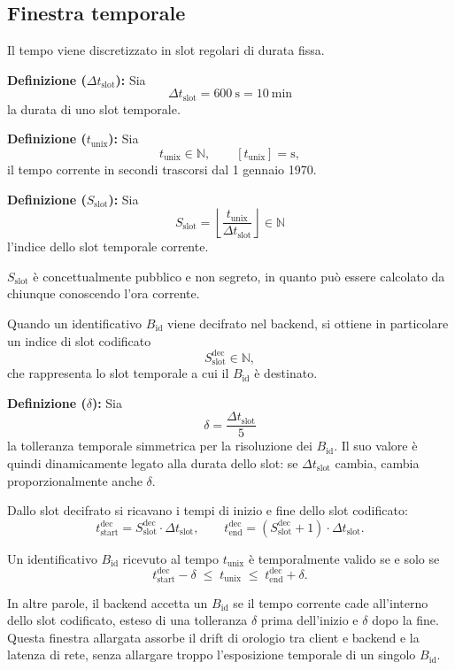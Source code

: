 \documentclass[a4paper,11pt]{article}
\begin{document}
\subsection{Finestra temporale}
Il tempo viene discretizzato in slot regolari di durata fissa.

\textbf{Definizione (\(\Delta t_{\text{slot}}\)):} Sia
\[
  \Delta t_{\text{slot}} = \SI{600}{\second} = \SI{10}{\minute}
\]
la durata di uno slot temporale.

\textbf{Definizione (\(t_{\text{unix}}\)):}
Sia
\[
  t_{\text{unix}} \in \mathbb{N}, \qquad [t_{\text{unix}}] = \si{\second},
\]
il tempo corrente in secondi trascorsi dal 1 gennaio 1970.

\textbf{Definizione (\(S_{\text{slot}}\)):}
Sia
\[
  S_{\text{slot}}
  = \left\lfloor \frac{t_{\text{unix}}}{\Delta t_{\text{slot}}} \right\rfloor
  \in \mathbb{N}
\]
l'indice dello slot temporale corrente.

\(S_{\text{slot}}\) è concettualmente pubblico e non segreto, in quanto può essere calcolato da
chiunque conoscendo l'ora corrente.

Quando un identificativo \(B_{\text{id}}\) viene decifrato nel backend, si ottiene in particolare un
indice di slot codificato
\[
  S_{\text{slot}}^{\text{dec}} \in \mathbb{N},
\]
che rappresenta lo slot temporale a cui il \(B_{\text{id}}\) è destinato.

\textbf{Definizione (\(\delta\)):}
Sia
\[
  \delta = \frac{\Delta t_{\text{slot}}}{5}
\]
la tolleranza temporale simmetrica per la risoluzione dei \(B_{\text{id}}\). Il suo valore è quindi
dinamicamente legato alla durata dello slot: se \(\Delta t_{\text{slot}}\) cambia, cambia
proporzionalmente anche \(\delta\).

Dallo slot decifrato si ricavano i tempi di inizio e fine dello slot codificato:
\[
  t_{\text{start}}^{\text{dec}}
  = S_{\text{slot}}^{\text{dec}} \cdot \Delta t_{\text{slot}}, \qquad
  t_{\text{end}}^{\text{dec}}
  = (S_{\text{slot}}^{\text{dec}} + 1) \cdot \Delta t_{\text{slot}}.
\]

Un identificativo \(B_{\text{id}}\) ricevuto al tempo \(t_{\text{unix}}\) è temporalmente valido se e
solo se
\[
  t_{\text{start}}^{\text{dec}} - \delta
  \;\le\;
  t_{\text{unix}}
  \;\le\;
  t_{\text{end}}^{\text{dec}} + \delta.
\]

In altre parole, il backend accetta un \(B_{\text{id}}\) se il tempo corrente cade all'interno dello
slot codificato, esteso di una tolleranza \(\delta\) prima dell'inizio e \(\delta\) dopo la fine.
Questa finestra allargata assorbe il drift di orologio tra client e backend e la latenza di rete,
senza allargare troppo l'esposizione temporale di un singolo \(B_{\text{id}}\).
\end{document}
